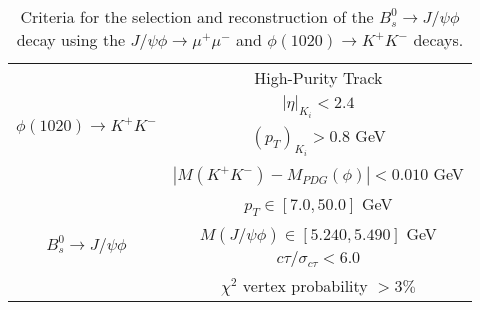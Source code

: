 {\begin{table}[!htp]
\begin{center}
\begin{tabular}{cc}
				\multirow{4}{*}{$\phi(1020) \to K^{+}K^{-}$} & High-Purity Track                                                                                                                                                                                                       \\ \cline{2-2} 
				& $|\eta|_{K_i} < 2.4$                                                                                                                                                                                                          \\ \cline{2-2} 
				& $(p_T)_{K_i} > 0.8$ GeV                                                                                                                                                                                                         \\ \cline{2-2} 
				& $|M(K^{+}K^{-}) - M_{PDG}(\phi)| <  0.010$ GeV                                                                                                                                                                          \\ \hline
				\multirow{4}{*}{$B^0_s \to J/\psi \phi$}    & $p_T \in [7.0, 50.0]$ GeV                                                                                                                                                                                               \\ \cline{2-2} 
				& $M(J/\psi \phi) \in [5.240, 5.490] $ GeV                                                                                                                                                                                \\ \cline{2-2} 
				& $c\tau / \sigma_{c\tau}< 6.0 $                                                                                                                                                                                          \\ \cline{2-2} 
				& $\chi^2$ vertex probability $ > 3 \%$                                                                                                                                                                         \\ \hline
			\end{tabular}
			
		\end{center}
	\caption{Criteria for the selection and reconstruction of the $B^0_s \to J/\psi \phi$ decay using the $J/\psi \phi \to \mu^{+}\mu^{-}$ and $\phi(1020) \to K^{+}K^{-}$ decays.}
	\label{table:sel_criteria}
	\end{table}

}
